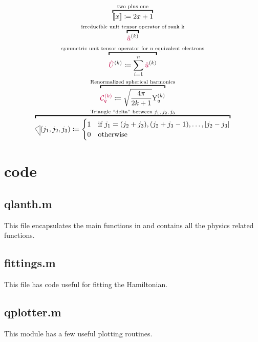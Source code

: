 \documentclass[11pt, twoside,openright]{article}
\begin{document}
\begin{gather} 
    \overbracket{\tpobraket{x} \DEF 2x+1}^{\text{two plus one}} \\
    \overbracket{\op{u}^{(k)}}^{\text{irreducible unit tensor operator of rank k}} \\ 
    \overbracket{\op{U}^{(k)} \DEF \sum_{i=1}^{n} \op{u}^{(k)} }^{\text{symmetric unit tensor operator for n equivalent electrons}} \\
    \overbracket{\Ckq{k}{q} \DEF \sqrt{\frac{4\pi}{2k+1}} \Ykq}^{\text{Renormalized spherical harmonics}} \\
    \overbracket{\tricondition{j_1,j_2,j_3} \DEF
    \begin{cases} 
        1 & \text{if } j_1 = (j_2 + j_3), (j_2 + j_3 - 1), \ldots, |j_2-j_3|\\
        0 & \text{otherwise}
        \end{cases}}^{\text{Triangle ``delta'' between $j_1,j_2,j_3$}} 
\end{gather}

\newpage

\section{code}\label{section:code}

\subsection{qlanth.m}

This file encapsulates the main functions in \qlanth and contains all the physics related functions.



\subsection{fittings.m}\label{sub:fittings.m}

This file has code useful for fitting the Hamiltonian.



\subsection{qplotter.m}\label{sub:qplotter.m}

This module has a few useful plotting routines.
\end{document}
